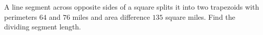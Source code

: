 A line segment across opposite sides of a square splits it into two trapezoids with perimeters $64$ and $76$ miles and area difference $135$ square miles. Find the dividing segment length.
